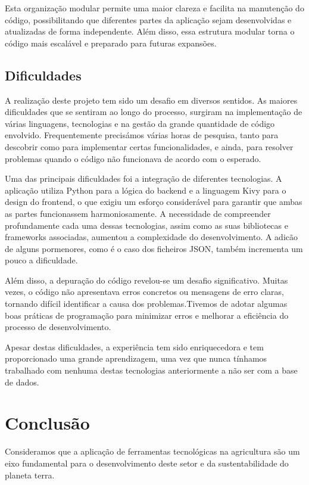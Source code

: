 \documentclass[a4paper,12pt]{report}
\begin{document}
	Esta organização modular permite uma maior clareza e facilita na manutenção do código, possibilitando que diferentes partes da aplicação sejam desenvolvidas e atualizadas de forma independente. Além disso, essa estrutura modular torna o código mais escalável e preparado para futuras expansões.
	
	
	\section{Dificuldades}
	A realização deste projeto tem sido um desafio em diversos sentidos. As maiores dificuldades que se sentiram ao longo do processo, surgiram na implementação de várias linguagens, tecnologias e na gestão da grande quantidade de código envolvido. Frequentemente precisámos várias horas de pesquisa, tanto para descobrir como para implementar certas funcionalidades, e ainda, para resolver problemas quando o código não funcionava de acordo com o esperado.
	
	Uma das principais dificuldades foi a integração de diferentes tecnologias. A aplicação utiliza Python para a lógica do backend e a linguagem Kivy para o design do frontend, o que exigiu um esforço considerável para garantir que ambas as partes funcionassem harmoniosamente. A necessidade de compreender profundamente cada uma dessas tecnologias, assim como as suas bibliotecas e frameworks associadas, aumentou a complexidade do desenvolvimento. A adicão de alguns pormenores, como é o caso dos ficheiros JSON, também incrementa um pouco a dificuldade.
	
	Além disso, a depuração do código revelou-se um desafio significativo. Muitas vezes, o código não apresentava erros concretos ou mensagens de erro claras, tornando difícil identificar a causa dos problemas.Tivemos de adotar algumas boas práticas de programação para minimizar erros e melhorar a eficiência do processo de desenvolvimento.
	
	Apesar destas dificuldades, a experiência tem sido enriquecedora e tem proporcionado uma grande aprendizagem, uma vez que nunca tínhamos trabalhado com nenhuma destas tecnologias anteriormente a não ser com a base de dados.
	
	
	\chapter{Conclusão}
	Consideramos que a aplicação de ferramentas tecnológicas na agricultura são um eixo fundamental para o desenvolvimento deste setor e da sustentabilidade do planeta terra.
	
\end{document}
